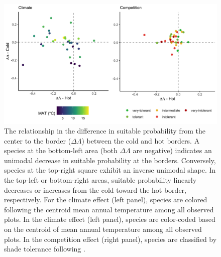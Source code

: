 \hypertarget{fig:figsupp3}{%
\begin{figure}
\centering
\includegraphics{manuscript/figs/fig-diff_sp_hot_vs_cold-1.png}
\caption[{The relationship in the difference in suitable probability
from the center to the border (\(\Delta\Lambda\)) between the cold and
hot borders.}]{The relationship in the difference in suitable
probability from the center to the border (\(\Delta\Lambda\)) between
the cold and hot borders. A species at the bottom-left area (both
\(\Delta\Lambda\) are negative) indicates an unimodal decrease in
suitable probability at the borders. Conversely, species at the
top-right square exhibit an inverse unimodal shape. In the top-left or
bottom-right areas, suitable probability linearly decreases or increases
from the cold toward the hot border, respectively. For the climate
effect (left panel), species are colored following the centroid mean
annual temperature among all observed plots. In the climate effect (left
panel), species are color-coded based on the centroid of mean annual
temperature among all observed plots. In the competition effect (right
panel), species are classified by shade tolerance following
\citet{burns1990silvics}.}
\label{fig:figsupp3}
\end{figure}
}

\newpage

